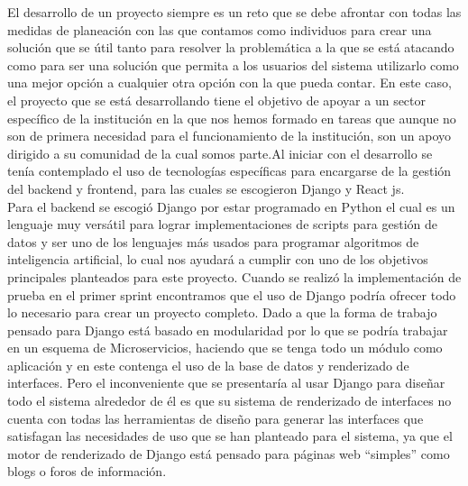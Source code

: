 El desarrollo de un proyecto siempre es un reto que se debe afrontar con todas las medidas de planeación con las que contamos como individuos para crear una solución que se útil tanto para resolver la problemática a la que se está atacando como para ser una solución que permita a los usuarios del sistema utilizarlo como una mejor opción a cualquier otra opción con la que pueda contar. En este caso, el proyecto que se está desarrollando tiene el objetivo de apoyar a un sector específico de la institución en la que nos hemos formado en tareas que aunque no son de primera necesidad para el funcionamiento de la institución, son un apoyo dirigido a su comunidad de la cual somos parte.Al iniciar con el desarrollo se tenía contemplado el uso de tecnologías específicas para encargarse de la gestión del backend y frontend, para las cuales se escogieron Django y React js.\\
\newline
Para el backend se escogió Django por estar programado en Python el cual es un lenguaje muy versátil para lograr implementaciones de scripts para gestión de datos y ser uno de los lenguajes más usados para programar algoritmos de inteligencia artificial, lo cual nos ayudará a cumplir con uno de los objetivos principales planteados para este proyecto. Cuando se realizó la implementación de prueba en el primer sprint encontramos que el uso de Django podría ofrecer todo lo necesario para crear un proyecto completo. Dado a que la forma de trabajo pensado para Django está basado en modularidad por lo que se podría trabajar en un esquema de Microservicios, haciendo que se tenga todo un módulo como aplicación y en este contenga el uso de la base de datos y renderizado de interfaces. Pero el inconveniente que se presentaría al usar Django para diseñar todo el sistema alrededor de él es que su sistema de renderizado de interfaces no cuenta con todas las herramientas de diseño para generar las interfaces que satisfagan las necesidades de uso que se han planteado para el sistema, ya que el motor de renderizado de Django está pensado para páginas web “simples” como blogs o foros de información.\\

